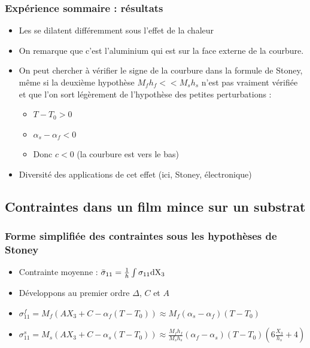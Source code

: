 \begin{frame}
\frametitle{Expérience sommaire : résultats}
    \begin{itemize}
        \item Les se dilatent différemment sous l'effet de la chaleur
        \item On remarque que c'est l'aluminium qui est sur la face externe de la courbure. 
        \item On peut chercher à vérifier le signe de la courbure dans la formule de Stoney, même si la deuxième hypothèse $M_f h_f << M_s h_s$ n'est pas vraiment vérifiée et que l'on sort légèrement de l'hypothèse des petites perturbations :
        \begin{itemize}    
            \item $T-T_0 > 0$
            \item $\alpha_s - \alpha_f < 0$
            \item Donc $c < 0$ (la courbure est vers le bas)
        \end{itemize}
        \item Diversité des applications de cet effet (ici, Stoney, électronique)
    \end{itemize}
\end{frame}



\subsection{Contraintes dans un film mince sur un substrat} %

\begin{frame}
\frametitle{Forme simplifiée des contraintes sous les hypothèses de Stoney}
\begin{itemize}
    \item Contrainte moyenne : $\bar{\sigma}_{11}=\frac{1}{h}\int\sigma_{11}\rm{d}X_3$
    \item Développons au premier ordre $\Delta$, $C$ et $A$
    \item $\sigma_{11}^f=M_f(AX_3+C-\alpha_f(T-T_0)) \approx M_f (\alpha_s - \alpha_f)(T-T_0)$
    \item $\sigma_{11}^s=M_s(AX_3+C-\alpha_s(T-T_0)) \approx \frac{M_fh_f}{M_sh_s} (\alpha_f-\alpha_s)(T-T_0)(6\frac{X_3}{h_s}+4)$
\end{itemize}
\end{frame}

